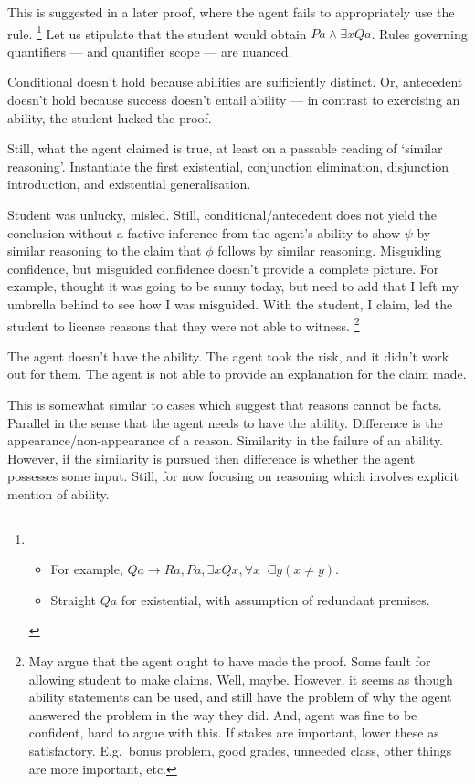 \documentclass[10pt]{article}
\newcommand{\hozlinedash}[0]{%
  \noindent\hdashrule[0.5ex][c]{\textwidth}{.1pt}{2.5pt}
}
\begin{document}
\begin{note}
  This is suggested in a later proof, where the agent fails to appropriately use the rule.\nolinebreak
  \footnote{
    \begin{itemize}
    \item For example, \(Qa \rightarrow Ra, Pa, \exists x Qx, \forall x \lnot \exists y (x \ne y)\).
    \item Straight \(Qa\) for existential, with assumption of redundant premises.
    \end{itemize}
  }
  Let us stipulate that the student would obtain \(Pa \land \exists x Qa\).
  Rules governing quantifiers --- and quantifier scope --- are nuanced.

  Conditional doesn't hold because abilities are sufficiently distinct.
  Or, antecedent doesn't hold because success doesn't entail ability --- in contrast to exercising an ability, the student lucked the proof.

  Still, what the agent claimed is true, at least on a passable reading of `similar reasoning'.
  Instantiate the first existential, conjunction elimination, disjunction introduction, and existential generalisation.

  Student was unlucky, misled.
  Still, conditional/antecedent does not yield the conclusion without a factive inference from the agent's ability to show \(\psi\) by similar reasoning to the claim that \(\phi\) follows by similar reasoning.
  Misguiding confidence, but misguided confidence doesn't provide a complete picture.
  For example, thought it was going to be sunny today, but need to add that I left my umbrella behind to see how I was misguided.
  With the student, I claim, led the student to license reasons that they were not able to witness.\nolinebreak
  \footnote{
    May argue that the agent ought to have made the proof.
    Some fault for allowing student to make claims.
    Well, maybe.
    However, it seems as though ability statements can be used, and still have the problem of why the agent answered the problem in the way they did.
    And, agent was fine to be confident, hard to argue with this.
    If stakes are important, lower these as satisfactory.
    E.g.\ bonus problem, good grades, unneeded class, other things are more important, etc.
  }
  \hozlinedash

  The agent doesn't have the ability.
  The agent took the risk, and it didn't work out for them.
  The agent is not able to provide an explanation for the claim made.
\end{note}

\begin{note}
  This is somewhat similar to cases which suggest that reasons cannot be facts.
  Parallel in the sense that the agent needs to have the ability.
  Difference is the appearance/non-appearance of a reason.
  Similarity in the failure of an ability.
  However, if the similarity is pursued then difference is whether the agent possesses some input.
  Still, for now focusing on reasoning which involves explicit mention of ability.
\end{note}
\end{document}
